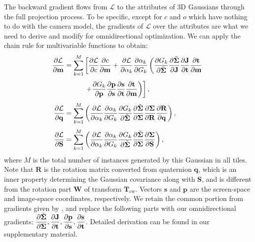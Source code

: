 \documentclass[10pt,twocolumn,letterpaper]{article}
\begin{document}
The backward gradient flows from $\mathcal{L}$ to the attributes of 3D Gaussians through the full projection process. To be specific, except for $c$ and $o$ which have nothing to do with the camera model, the gradients of $\mathcal{L}$ over the attributes are what we need to derive and modify for omnidirectional optimization. We can apply the chain rule for multivariable functions to obtain:
\begin{align}
    \frac{\partial \mathcal{L}}{\partial \mathbf{m}} = \sum_{k=1}^M &
    \left[
        \frac{\partial \mathcal{L}}{\partial c}
        \frac{\partial c}{\partial \mathbf{m}}
        +
        \frac{\partial \mathcal{L}}{\partial \alpha_k}
        \frac{\partial \alpha_k}{\partial G_k}
        \left(
            \frac{\partial G_k}{\partial \Tilde{\mathbf{\Sigma}}}
            \frac{\partial \Tilde{\mathbf{\Sigma}}}{\partial \mathbf{J}}
            \frac{\partial \mathbf{J}}{\partial \mathbf{t}}
            \frac{\partial \mathbf{t}}{\partial \mathbf{m}}\right.\right.\notag \\[3pt]
        & \left.\left. +
            \frac{\partial G_k}{\partial \mathbf{p}}
            \frac{\partial \mathbf{p}}{\partial \mathbf{s}}
            \frac{\partial \mathbf{s}}{\partial \mathbf{t}}
            \frac{\partial \mathbf{t}}{\partial \mathbf{m}}
        \right)
    \right] ,\\[3pt]
    \frac{\partial \mathcal{L}}{\partial \mathbf{q}} = \sum_{k=1}^M & \left(
        \frac{\partial \mathcal{L}}{\partial \alpha_k}
        \frac{\partial \alpha_k}{\partial G_k}
        \frac{\partial G_k}{\partial \Tilde{\mathbf{\Sigma}}}
        \frac{\partial \Tilde{\mathbf{\Sigma}}}{\partial \mathbf{\Sigma}}
        \frac{\partial \mathbf{\Sigma}}{\partial \mathbf{R}}
        \frac{\partial \mathbf{R}}{\partial \mathbf{q}}
    \right) ,\\[3pt]
    \frac{\partial \mathcal{L}}{\partial \mathbf{S}} = \sum_{k=1}^M & \left(
        \frac{\partial \mathcal{L}}{\partial \alpha_k}
        \frac{\partial \alpha_k}{\partial G_k}
        \frac{\partial G_k}{\partial \Tilde{\mathbf{\Sigma}}}
        \frac{\partial \Tilde{\mathbf{\Sigma}}}{\partial \mathbf{\Sigma}}
        \frac{\partial \mathbf{\Sigma}}{\partial \mathbf{S}}
    \right) ,
\end{align}
where $M$ is the total number of instances generated by this Gaussian in all tiles. {Note that $\mathbf{R}$ is the rotation matrix converted from quaternion $\mathbf{q}$, which is an inner property determining the Gaussian covariance along with $\mathbf{S}$, and is different from the rotation part $\mathbf{W}$ of transform $\mathbf{T}_\text{cw}$.} Vectors $\mathbf{s}$ and $\mathbf{p}$ are the screen-space and image-space coordinates, respectively. We retain the common portion from gradients given by \cite{3dgs}, and replace the following parts with our omnidirectional gradients:
$\displaystyle{\frac{\partial \Tilde{\mathbf{\Sigma}}}{\partial \mathbf{\Sigma}}},
\displaystyle{\frac{\partial \mathbf{J}}{\partial \mathbf{t}}},
\displaystyle{\frac{\partial \mathbf{p}}{\partial \mathbf{s}}},
\displaystyle{\frac{\partial \mathbf{s}}{\partial \mathbf{t}}}$.
Detailed derivation can be found in our supplementary material.
\end{document}
